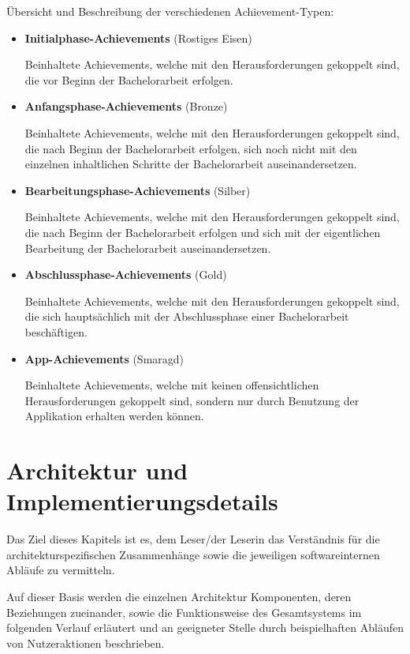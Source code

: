 \documentclass[bibliography=totoc,listof=totoc,BCOR=5mm,DIV=12,oneside]{scrbook}
\begin{document}
\par \bigskip Übersicht und Beschreibung der verschiedenen Achievement-Typen:
\begin{itemize}
\item \textbf{Initialphase-Achievements} (Rostiges Eisen)
\par Beinhaltete Achievements, welche mit den Herausforderungen gekoppelt sind, die vor Beginn der Bachelorarbeit erfolgen.
\item \textbf{Anfangsphase-Achievements} (Bronze)
\par Beinhaltete Achievements, welche mit den Herausforderungen gekoppelt sind, die nach Beginn der Bachelorarbeit erfolgen, sich noch nicht mit den einzelnen inhaltlichen Schritte der Bachelorarbeit auseinandersetzen.
\item \textbf{Bearbeitungsphase-Achievements} (Silber)
\par Beinhaltete Achievements, welche mit den Herausforderungen gekoppelt sind, die nach Beginn der Bachelorarbeit erfolgen und sich mit der eigentlichen Bearbeitung der Bachelorarbeit auseinandersetzen.
\item \textbf{Abschlussphase-Achievements} (Gold)
\par Beinhaltete Achievements, welche mit den Herausforderungen gekoppelt sind, die sich hauptsächlich mit der Abschlussphase einer Bachelorarbeit beschäftigen.
\item \textbf{App-Achievements} (Smaragd)
\par Beinhaltete Achievements, welche mit keinen offensichtlichen Herausforderungen gekoppelt sind, sondern nur durch Benutzung der Applikation erhalten werden können.
\end{itemize} 

\chapter{Architektur und Implementierungsdetails} \label{chap:architektur}
\par Das Ziel dieses Kapitels ist es, dem Leser/der Leserin das Verständnis für die architekturspezifischen Zusammenhänge sowie die jeweiligen softwareinternen Abläufe zu vermitteln. 
\par Auf dieser Basis werden die einzelnen Architektur Komponenten, deren Beziehungen zueinander, sowie die Funktionsweise des Gesamtsystems im folgenden Verlauf erläutert und an geeigneter Stelle durch beispielhaften Abläufen von Nutzeraktionen beschrieben.
\end{document}
